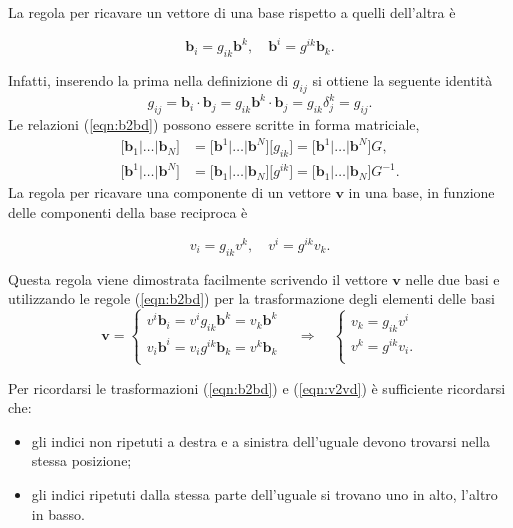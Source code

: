   La regola per ricavare un vettore di una base rispetto a quelli dell'altra è
\begin{fBox}
  \begin{equation}\label{eqn:b2bd}
   \bm{b}_i = g_{ik} \bm{b}^k , \quad
   \bm{b}^i = g^{ik} \bm{b}_k .
  \end{equation}
\end{fBox}
 Infatti, inserendo la prima nella definizione di $g_{ij}$ si ottiene la seguente identità
  \begin{equation}
 g_{ij} = \bm{b}_i \cdot \bm{b}_j = g_{ik}\bm{b}^k \cdot \bm{b}_j = g_{ik} \delta^k_j = g_{ij} .
  \end{equation}
Le relazioni (\ref{eqn:b2bd}) possono essere scritte in forma matriciale,
\begin{equation}
\begin{aligned}
 \big[ \bm{b}_1 | \dots | \bm{b}_N\big] & =
 \big[ \bm{b}^1 | \dots | \bm{b}^N\big] \big[ g_{ik} \big] =
 \big[ \bm{b}^1 | \dots | \bm{b}^N\big] G , \\
 \big[ \bm{b}^1 | \dots | \bm{b}^N\big] & =
 \big[ \bm{b}_1 | \dots | \bm{b}_N\big] \big[ g^{ik} \big] =
 \big[ \bm{b}_1 | \dots | \bm{b}_N\big] G^{-1}  .
\end{aligned}
\end{equation}
%
 La regola per ricavare una componente di un vettore $\bm{v}$ in una base, in funzione delle componenti della base reciproca è
\begin{fBox}
  \begin{equation}\label{eqn:v2vd}
   v_i = g_{ik} v^k , \quad
   v^i = g^{ik} v_k .
  \end{equation}
\end{fBox}
%
Questa regola viene dimostrata facilmente scrivendo il vettore $\bm{v}$ nelle due basi e utilizzando le regole (\ref{eqn:b2bd}) per la trasformazione degli elementi delle basi
  \begin{equation}
   \bm{v} = \begin{cases}
     v^i \bm{b}_i = v^i g_{ik} \bm{b}^k = v_k \bm{b}^k \\
     v_i \bm{b}^i = v_i g^{ik} \bm{b}_k = v^k \bm{b}_k\\
   \end{cases} \quad \Rightarrow \quad
   \begin{cases}
     v_k = g_{ik} v^i   \\
     v^k = g^{ik} v_i . \\
   \end{cases}
  \end{equation}
%
\begin{remark}
  Per ricordarsi le trasformazioni (\ref{eqn:b2bd}) e (\ref{eqn:v2vd}) è sufficiente ricordarsi che:
  \begin{itemize}
    \item gli indici non ripetuti a destra e a sinistra dell'uguale devono trovarsi nella stessa posizione;
    \item gli indici ripetuti dalla stessa parte dell'uguale si trovano uno in alto, l'altro in basso.
  \end{itemize}
\end{remark}
  
